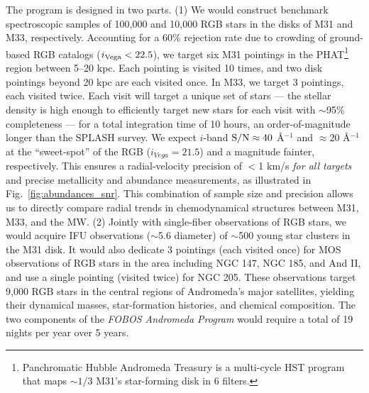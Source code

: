 \documentclass[11pt,a4paper,twoside,onecolumn,openany,final,oldfontcommands]{memoir}
\begin{document}
The program is designed in two parts. (1) We would construct benchmark spectroscopic samples of 100,000 and 10,000 RGB stars in the disks of M31 and M33, respectively.  Accounting for a 60\% rejection rate \citep{dorman12} due to crowding of ground-based RGB catalogs ($i_{\rm Vega} < 22.5$), we target six M31 pointings in the PHAT\footnote{Panchromatic Hubble Andromeda Treasury \citep{phat} is a multi-cycle HST program that maps $\sim1/3$ M31's star-forming disk in 6 filters.} region between 5--20 kpc.  Each pointing is visited 10 times, and two disk pointings beyond 20 kpc are each visited once.  In M33, we target 3 pointings, each visited twice.  Each visit will target a unique set of stars --- the stellar density is high enough to efficiently target new stars for each visit with $\sim$95\% completeness --- for a total integration time of 10 hours, an order-of-magnitude longer than the SPLASH survey.  We expect $i$-band ${\rm S/N} \approx 40$ \AA$^{-1}$ and $\approx 20$ \AA$^{-1}$ at the  ``sweet-spot'' of the RGB ($i_{Vega} = 21.5$) and a magnitude fainter, respectively.  This ensures a radial-velocity precision of $<$1 km/s {\it for all targets} and precise metallicity and abundance measurements, as illustrated in Fig.~\ref{fig:abundances_snr}.
This combination of sample size and precision allows us to directly compare radial trends in chemodynamical structures between M31, M33, and the MW. (2) Jointly with single-fiber observations of RGB stars, we would acquire IFU observations ($\sim$5.6\arcsec{} diameter) of $\sim$500 young star clusters in the M31 disk.  It would also dedicate 3 pointings (each visited once) for MOS observations of RGB stars in the area including NGC 147, NGC 185, and And II, and use a single pointing (visited twice) for NGC 205.  These observations target 9,000 RGB stars in the central regions of Andromeda's major satellites, yielding their dynamical masses, star-formation histories, and chemical composition.  The two components of the {\it FOBOS Andromeda Program} would require a total of 19 nights per year over 5 years. 



\newpage


\newpage
\end{document}
